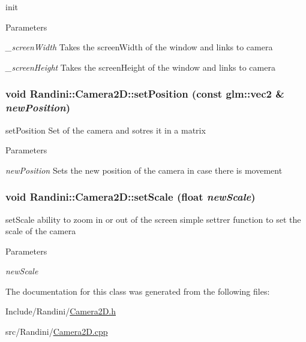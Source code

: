 init 
\begin{DoxyParams}{Parameters}
\item[{\em \_\-screenWidth}]Takes the screenWidth of the window and links to camera \item[{\em \_\-screenHeight}]Takes the screenHeight of the window and links to camera \end{DoxyParams}
\hypertarget{classRandini_1_1Camera2D_a13745cf68d6dc73d6759b3a3ee1c4cb1}{
\subsubsection[{setPosition}]{\setlength{\rightskip}{0pt plus 5cm}void Randini::Camera2D::setPosition (const glm::vec2 \& {\em newPosition})}}
\label{classRandini_1_1Camera2D_a13745cf68d6dc73d6759b3a3ee1c4cb1}


setPosition Set of the camera and sotres it in a matrix 
\begin{DoxyParams}{Parameters}
\item[{\em newPosition}]Sets the new position of the camera in case there is movement \end{DoxyParams}
\hypertarget{classRandini_1_1Camera2D_a6446d430b1c5b5c3f3435c5ebc8fdfa6}{
\subsubsection[{setScale}]{\setlength{\rightskip}{0pt plus 5cm}void Randini::Camera2D::setScale (float {\em newScale})}}
\label{classRandini_1_1Camera2D_a6446d430b1c5b5c3f3435c5ebc8fdfa6}


setScale ability to zoom in or out of the screen simple settrer function to set the scale of the camera 
\begin{DoxyParams}{Parameters}
\item[{\em newScale}]\end{DoxyParams}


The documentation for this class was generated from the following files:\begin{DoxyCompactItemize}
\item 
Include/Randini/\hyperlink{Camera2D_8h}{Camera2D.h}\item 
src/Randini/\hyperlink{Camera2D_8cpp}{Camera2D.cpp}\end{DoxyCompactItemize}
